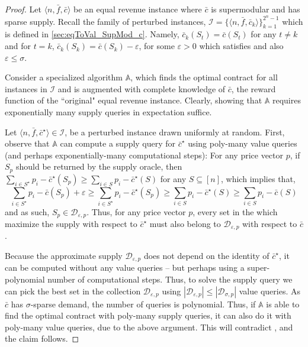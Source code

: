 \documentclass[11pt]{article}
\newcommand{\eps}{\varepsilon}
\newcommand{\A}{\mathbb{A}}
\newcommand{\I}{\mathcal{I}}
\newcommand{\feq}{\bar{f}}
\newcommand{\ceq}{\bar{c}}
\newcommand{\supply}[2]{\mathcal{D}_{{#1},{#2}}}
\newcommand{\supSigP}{\supply{\sigma}{p}}
\newcommand{\eqRevInst}{\langle n,\feq,\ceq \rangle}
\begin{document}
\begin{proof}
    Let $\eqRevInst$ be an equal revenue instance where $\ceq$ is supermodular and has sparse supply.
    Recall the family of perturbed instances, $\I = \{\langle n,\feq,\ceq_k\rangle\}_{k=1}^{2^n-1}$ which is defined in \ref{sec:eqToVal_SupMod_c}. 
    Namely, $\ceq_k(S_t) = \ceq(S_t)$ for any $t \ne k$ and for $t=k$, $\ceq_k(S_k) = \ceq(S_k) - \eps$, for some $\eps>0$ which satisfies  and also $\eps \le \sigma$.
    
    Consider a specialized algorithm $\A$, which finds the optimal contract for all instances in $\I$ and is augmented with complete knowledge of $\ceq$, the reward function of the ``original" equal revenue instance.
    Clearly, showing that $\A$ requires exponentially many supply queries in expectation suffice.
    
    Let $\langle n,\feq,\ceq^\star\rangle \in \I$, be a perturbed instance drawn uniformly at random.
    First, observe that $\A$ can compute a supply query for $\ceq^\star$ using poly-many value queries (and perhaps exponentially-many computational steps):
    For any price vector $p$, if $S_p$ should be returned by the supply oracle, then 
    $\sum_{i \in S^\star}p_i - \ceq^\star(S_p) \ge \sum_{i \in S} p_i - \ceq^\star(S)$ for any $S \subseteq [n]$, which implies that,
    $$
    \sum_{i \in S^\star} p_i - \ceq(S_p) + \eps
    \ge
    \sum_{i \in S^\star} p_i - \ceq^\star(S_p)
    \ge
    \sum_{i \in S} p_i - \ceq^\star(S)
    \ge
    \sum_{i \in S} p_i - \ceq(S)
    $$
    and as such, $S_p \in \supply{\eps}{p}$. 
    Thus, for any price vector $p$, every set in the which maximize the supply with respect to $\ceq^\star$ must also belong to $\supply{\eps}{p}$ with respect to $\ceq$.
    
    Because the approximate supply $\supply{\eps}{p}$ does not depend on the identity of $\ceq^\star$, it can be computed without any value queries -- but perhaps using a super-polynomial number of computational steps.
    Thus, to solve the supply query we can pick the best set in the collection $\supply{\eps}{p}$ using $|\supply{\eps}{p}|\le |\supSigP|$ value queries. As $\ceq$ has $\sigma$-sparse demand, the number of queries is polynomial.
    Thus, if $\A$ is able to find the optimal contract with poly-many supply queries, it can also do it with poly-many value queries, due to the above argument. This will contradict , and the claim follows.
\end{proof}
\end{document}
